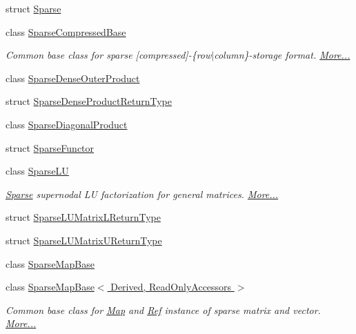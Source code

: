 \begin{DoxyCompactItemize}
struct \hyperlink{struct_eigen_1_1_sparse}{Sparse}
\item 
class \hyperlink{group___sparse_core___module_class_eigen_1_1_sparse_compressed_base}{Sparse\+Compressed\+Base}
\begin{DoxyCompactList}\small\item\em Common base class for sparse \mbox{[}compressed\mbox{]}-\/\{row$\vert$column\}-\/storage format.  \hyperlink{group___sparse_core___module_class_eigen_1_1_sparse_compressed_base}{More...}\end{DoxyCompactList}\item 
class \hyperlink{class_eigen_1_1_sparse_dense_outer_product}{Sparse\+Dense\+Outer\+Product}
\item 
struct \hyperlink{struct_eigen_1_1_sparse_dense_product_return_type}{Sparse\+Dense\+Product\+Return\+Type}
\item 
class \hyperlink{class_eigen_1_1_sparse_diagonal_product}{Sparse\+Diagonal\+Product}
\item 
struct \hyperlink{struct_eigen_1_1_sparse_functor}{Sparse\+Functor}
\item 
class \hyperlink{group___sparse_l_u___module_class_eigen_1_1_sparse_l_u}{Sparse\+LU}
\begin{DoxyCompactList}\small\item\em \hyperlink{struct_eigen_1_1_sparse}{Sparse} supernodal LU factorization for general matrices.  \hyperlink{group___sparse_l_u___module_class_eigen_1_1_sparse_l_u}{More...}\end{DoxyCompactList}\item 
struct \hyperlink{struct_eigen_1_1_sparse_l_u_matrix_l_return_type}{Sparse\+L\+U\+Matrix\+L\+Return\+Type}
\item 
struct \hyperlink{struct_eigen_1_1_sparse_l_u_matrix_u_return_type}{Sparse\+L\+U\+Matrix\+U\+Return\+Type}
\item 
class \hyperlink{class_eigen_1_1_sparse_map_base}{Sparse\+Map\+Base}
\item 
class \hyperlink{group___sparse_core___module_class_eigen_1_1_sparse_map_base_3_01_derived_00_01_read_only_accessors_01_4}{Sparse\+Map\+Base$<$ Derived, Read\+Only\+Accessors $>$}
\begin{DoxyCompactList}\small\item\em Common base class for \hyperlink{group___core___module_class_eigen_1_1_map}{Map} and \hyperlink{group___core___module_class_eigen_1_1_ref}{Ref} instance of sparse matrix and vector.  \hyperlink{group___sparse_core___module_class_eigen_1_1_sparse_map_base_3_01_derived_00_01_read_only_accessors_01_4}{More...}\end{DoxyCompactList}\item 

\end{DoxyCompactItemize}
